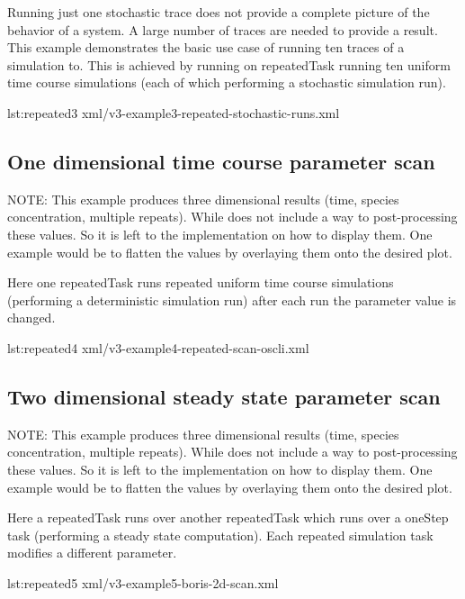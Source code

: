 Running just one stochastic trace does not provide a complete picture of the behavior of a system. A large number of traces are needed to provide a result. This example demonstrates the basic use case of running ten traces of a simulation to. This is achieved by running on repeatedTask running ten uniform time course simulations (each of which performing a stochastic simulation run). 

%
%

{lst:repeated3}
{xml/v3-example3-repeated-stochastic-runs.xml}

\subsection{One dimensional time course parameter scan}
NOTE: This example produces three dimensional results (time, species concentration, multiple repeats). While \LoneVtwo does not include a way to post-processing these values. So it is left to the implementation on how to display them. One example would be to flatten the values by overlaying them onto the desired plot. 

Here one repeatedTask  runs repeated uniform time course simulations (performing a deterministic simulation run) after each run the parameter value is changed.


%
%

{lst:repeated4}
{xml/v3-example4-repeated-scan-oscli.xml}

\subsection{Two dimensional steady state parameter scan}
NOTE: This example produces three dimensional results (time, species concentration, multiple repeats). While \LoneVtwo does not include a way to post-processing these values. So it is left to the implementation on how to display them. One example would be to flatten the values by overlaying them onto the desired plot. 

Here a repeatedTask runs over another repeatedTask which runs over a oneStep task (performing a steady state computation). Each repeated simulation task modifies a different parameter.

%
%

{lst:repeated5}
{xml/v3-example5-boris-2d-scan.xml}